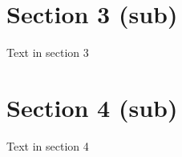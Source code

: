 \documentclass[test.tex]{subfiles}
\begin{document}
\section{Section 3 (sub)}
\label{sec:section3_sub}
Text in section 3

\section{Section 4 (sub)}
\label{sec:section4_sub}
Text in section 4
\end{document}
